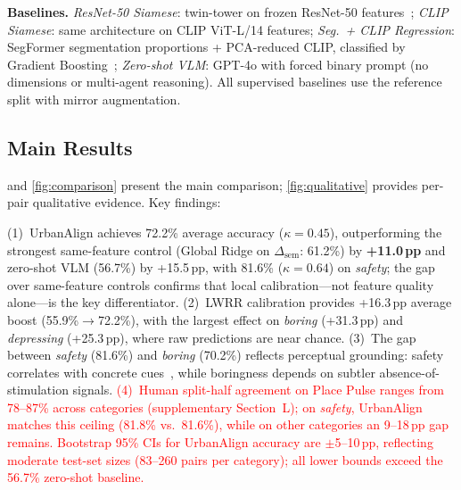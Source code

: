 \documentclass[runningheads]{llncs}
\begin{document}
\smallskip\noindent\textbf{Baselines.}
\emph{ResNet-50 Siamese}: twin-tower on frozen ResNet-50 features~\cite{koch2015siamese};
\emph{CLIP Siamese}: same architecture on CLIP ViT-L/14 features;
\emph{Seg.\ + CLIP Regression}: SegFormer segmentation proportions + PCA-reduced CLIP, classified by Gradient Boosting~\cite{chen2018deeplabv3plus};
\emph{Zero-shot VLM}: GPT-4o with forced binary prompt (no dimensions or multi-agent reasoning).
All supervised baselines use the reference split with mirror augmentation.


\subsection{Main Results}

 and \cref{fig:comparison} present the main comparison; \cref{fig:qualitative} provides per-pair qualitative evidence.
Key findings:

(1)~UrbanAlign achieves 72.2\% average accuracy ($\kappa{=}0.45$), outperforming the strongest same-feature control (Global Ridge on $\Delta_{\mathrm{sem}}$: 61.2\%) by \textbf{+11.0\,pp} and zero-shot VLM (56.7\%) by +15.5\,pp, with 81.6\% ($\kappa{=}0.64$) on \emph{safety}; the gap over same-feature controls confirms that local calibration---not feature quality alone---is the key differentiator.
(2)~LWRR calibration provides +16.3\,pp average boost (55.9\%$\to$72.2\%), with the largest effect on \emph{boring} (+31.3\,pp) and \emph{depressing} (+25.3\,pp), where raw predictions are near chance.
(3)~The gap between \emph{safety} (81.6\%) and \emph{boring} (70.2\%) reflects perceptual grounding: safety correlates with concrete cues~\cite{wilson1982broken,jeffery1971cpted}, while boringness depends on subtler absence-of-stimulation signals.
\textcolor{red}{(4)~Human split-half agreement on Place Pulse ranges from 78--87\% across categories (supplementary Section~L); on \emph{safety}, UrbanAlign matches this ceiling (81.8\% vs.\ 81.6\%), while on other categories an 9--18\,pp gap remains.
Bootstrap 95\% CIs for UrbanAlign accuracy are $\pm$5--10\,pp, reflecting moderate test-set sizes (83--260 pairs per category); all lower bounds exceed the 56.7\% zero-shot baseline.}
\end{document}
